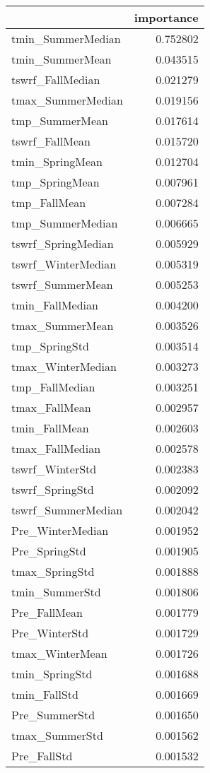 \begin{tabular}{lr}
\toprule
 & importance \\
\midrule
tmin_SummerMedian & 0.752802 \\
tmin_SummerMean & 0.043515 \\
tswrf_FallMedian & 0.021279 \\
tmax_SummerMedian & 0.019156 \\
tmp_SummerMean & 0.017614 \\
tswrf_FallMean & 0.015720 \\
tmin_SpringMean & 0.012704 \\
tmp_SpringMean & 0.007961 \\
tmp_FallMean & 0.007284 \\
tmp_SummerMedian & 0.006665 \\
tswrf_SpringMedian & 0.005929 \\
tswrf_WinterMedian & 0.005319 \\
tswrf_SummerMean & 0.005253 \\
tmin_FallMedian & 0.004200 \\
tmax_SummerMean & 0.003526 \\
tmp_SpringStd & 0.003514 \\
tmax_WinterMedian & 0.003273 \\
tmp_FallMedian & 0.003251 \\
tmax_FallMean & 0.002957 \\
tmin_FallMean & 0.002603 \\
tmax_FallMedian & 0.002578 \\
tswrf_WinterStd & 0.002383 \\
tswrf_SpringStd & 0.002092 \\
tswrf_SummerMedian & 0.002042 \\
Pre_WinterMedian & 0.001952 \\
Pre_SpringStd & 0.001905 \\
tmax_SpringStd & 0.001888 \\
tmin_SummerStd & 0.001806 \\
Pre_FallMean & 0.001779 \\
Pre_WinterStd & 0.001729 \\
tmax_WinterMean & 0.001726 \\
tmin_SpringStd & 0.001688 \\
tmin_FallStd & 0.001669 \\
Pre_SummerStd & 0.001650 \\
tmax_SummerStd & 0.001562 \\
Pre_FallStd & 0.001532 \\

\end{tabular}
